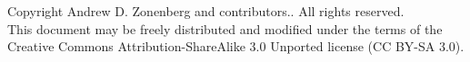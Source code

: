 Copyright  Andrew D. Zonenberg and contributors.. All rights reserved. \\

This document may be freely distributed and modified under the terms of the Creative Commons Attribution-ShareAlike 3.0
Unported license (CC BY-SA 3.0).
